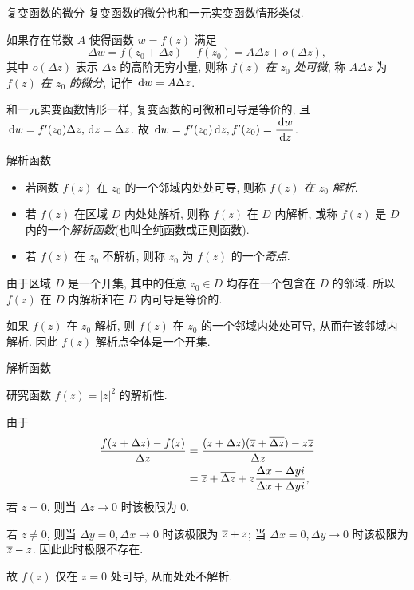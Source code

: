 \begin{frame}{复变函数的微分}
\onslide<+->
复变函数的微分也和一元实变函数情形类似.
\begin{definition}
如果存在常数 $A$ 使得函数 $w=f(z)$ 满足
\[\Delta w=f(z_0+\Delta z)-f(z_0)=A\Delta z+o(\Delta z),\]
其中 $o(\Delta z)$ 表示 $\Delta z$ 的高阶无穷小量,
\onslide<+->
则称 \emph{$f(z)$ 在 $z_0$ 处可微},
\onslide<+->
称 $A\Delta z$ 为 \emph{$f(z)$ 在 $z_0$ 的微分}, 记作 $\,\mathrm{d} w=A \Delta z$.
\end{definition}
\onslide<+->
和一元实变函数情形一样, 复变函数的可微和可导是等价的, 且 $\,\mathrm{d} w=f'(z_0)\Delta z, \,\mathrm{d} z=\Delta z$.
\onslide<+->
故 \emph{$\,\mathrm{d} w=f'(z_0)\,\mathrm{d} z,f'(z_0)=\dfrac{\,\mathrm{d} w}{\,\mathrm{d} z}$}.
\end{frame}


\begin{frame}{解析函数}
\begin{definition}
\begin{itemize}
\item 若函数 $f(z)$ 在 $z_0$ 的一个邻域内处处可导, 则称 \emph{$f(z)$ 在 $z_0$ 解析}.
\item 若 $f(z)$ 在区域 $D$ 内处处解析, 则称 $f(z)$ 在 $D$ 内解析, 或称 $f(z)$ 是 $D$ 内的一个\emph{解析函数}(也叫全纯函数或正则函数).
\item 若 $f(z)$ 在 $z_0$ 不解析, 则称 $z_0$ 为 $f(z)$ 的一个\emph{奇点}.
\end{itemize}
\end{definition}
\onslide<+->
由于区域 $D$ 是一个开集, 其中的任意 $z_0\in D$ 均存在一个包含在 $D$ 的邻域. 
\onslide<+->
所以 \alert{$f(z)$ 在 $D$ 内解析和在 $D$ 内可导是等价的}.

\onslide<+->
如果 $f(z)$ 在 $z_0$ 解析, 则 $f(z)$ 在 $z_0$ 的一个邻域内处处可导, 从而在该邻域内解析.
\onslide<+->
因此 \alert{$f(z)$ 解析点全体是一个开集}.
\end{frame}


\begin{frame}{解析函数}
\begin{example}
研究函数 $f(z)=|z|^2$ 的解析性.
\end{example}
\begin{solution}
\indent
由于
\vspace{-5pt}
\begin{align*}
\frac{f(z+\Delta z)-f(z)}{\Delta z}
&=\frac{(z+\Delta z)(\overline z+\overline{\Delta z})-z\overline z}{\Delta z}\\
&=\overline z+\overline{\Delta z}+z\frac{\Delta x-\Delta yi}{\Delta x+\Delta yi},
\end{align*}
\onslide<+->
若 $z=0$, 则当 $\Delta z\to 0$ 时该极限为 $0$.

\indent
\onslide<+->
若 $z\neq0$, 则当 $\Delta y=0,\Delta x\to 0$ 时该极限为 $\overline z+z$;
\onslide<+->
当 $\Delta x=0,\Delta y\to 0$ 时该极限为 $\overline z-z$.
\onslide<+->
因此此时极限不存在.

\indent
\onslide<+->
故 $f(z)$ 仅在 $z=0$ 处可导, 从而处处不解析.
\end{solution}
\end{frame}

